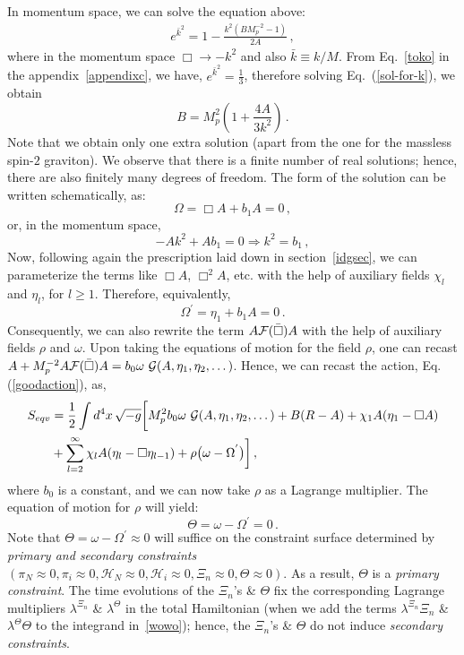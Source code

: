 \documentclass[a4paper,12pt]{article}
\newcommand{\bbox}{\bar{\Box}}
\newcommand{\be}{\begin{equation}}
\newcommand{\ee}{\end{equation}}
\newcommand{\la}{\lambda}
\newcommand{\cF}{{\cal F}}
\newcommand{\+}{^{\dagger}}
\newcommand{\Ra}{\Rightarrow}
\newcommand{\kb}{\bar{k}}
\newcommand{\2}{\frac{1}{2}}
\newcommand{\3}{\frac{1}{3}}
\newcommand{\4}{\frac{1}{4}}
\newcommand{\6}{\frac{1}{6}}
\newcommand{\8}{\frac{1}{8}}
\newcommand{\non}{\nonumber\\}
\begin{document}
In momentum space, we can solve the equation above:
\begin{eqnarray}\label{sol-for-k}
e^{\bar{k}^{2}}=1-\frac{k^{2}(BM^{-2}_{p}-1)}{2A}\,,
\end{eqnarray}
where  in the momentum space $\Box\rightarrow -k^2$ and also $\bar{k}\equiv k/M$. From Eq.~\eqref{toko} in the appendix~\ref{appendixc}, we have, $e^{\kb^2}=\frac{1}{3}$, therefore solving Eq.~(\ref{sol-for-k}), we obtain
\be
B=M^{2}_{p}\left(1+\frac{4A}{3k^{2}}\right) \,.
\ee
Note that we obtain only one extra solution (apart from the one for the massless spin-$2$ graviton). We observe that there is a finite number of real solutions; hence, there are also finitely many degrees of freedom. The form of the solution can be written schematically, as: 
\begin{equation}\label{Sol-IDG}
\Omega=\Box A+b_1A=0\,,
\end{equation}
or, in the momentum space,
\be
-Ak^{2}+Ab_{1}=0 \Ra k^{2}=b_{1} \,,
\ee
Now, following again the prescription laid down in section~\ref{idgsec}, we can parameterize the terms like $\Box A$, $\Box^{2}A$, etc. with the help of auxiliary fields $\chi_l$ and $\eta_{l}$, for $l \geq 1$. Therefore, equivalently,
\be
\Omega^{'}=\eta_{1}+b_{1}A=0 \,.
\ee
Consequently, we can also rewrite the term $A \cF(\bbox) A$ with the help of auxiliary fields $\rho$ and $\omega$. Upon taking the equations of motion for the field $\rho$, one can recast $A+M_{p}^{-2}A \cF(\bbox)A=b_{0}\omega~{\cal G}(A,\eta_{1},\eta_{2},\dots)$. Hence, we  can recast the action, Eq. (\ref{goodaction}), as, 
\begin{align}
S_{eqv}&=\frac{1}{2}\int d^{4} x \, \sqrt{-g}\bigg[M^{2}_{p}b_{0}\omega~{\cal G}(A,\eta_{1},\eta_{2},\dots)+B(R-A)+\chi_{1}A(\eta_{1}-\Box A)\non
&+\sum
^{\infty}_{l=2}\chi_lA(\eta_l-\Box
\eta_{l-1})+\rho\big(\omega-\Omega^{'}\big)\bigg]\,,
\end{align} 
where $b_0$ is a constant,  and we can now take $\rho$ as a Lagrange multiplier. The equation of motion for $\rho$ will yield:
\begin{equation}\label{pppp}
\Theta=\omega-\Omega^{'}=0\,.
\end{equation}
Note that $\Theta =\omega-\Omega^{'}\approx 0$ will suffice on the constraint surface determined by {\it primary and secondary constraints}
$(\pi_N\approx0,\pi_i\approx0,\mathcal{H}_N\approx0,\mathcal{H}_{i}\approx0,\Xi_{n}\approx0,\Theta\approx0)$. As a result, $\Theta$ is a {\it primary constraint}. 
The time evolutions of the $\Xi_n$'s \& $\Theta$ fix the corresponding Lagrange multipliers $\la^{\Xi_n}$ \& $\la^{\Theta}$ in the total Hamiltonian (when we add the terms $\la^{\Xi_n}\Xi_{n}$ \& $\la^{\Theta}\Theta$ to the integrand in~\eqref{wowo}); hence, the $\Xi_n$'s \& $\Theta$ do not induce \textit{secondary constraints}.
\end{document}
